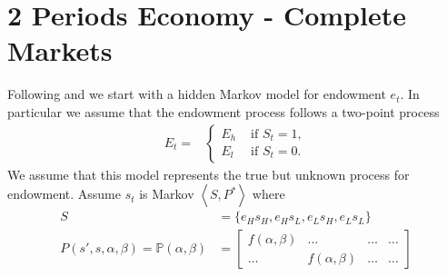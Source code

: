 \documentclass[a4paper,12pt]{article}
\begin{document}
\newpage
\section{2 Periods Economy - Complete Markets}
Following \cite{CS08} and \cite{CS09} we start with a hidden Markov model for endowment $e_t$. In particular we assume that the endowment process follows a two-point process
\begin{align*}
E_t = &
\begin{cases}
E_h &\text{ if $S_t = 1$}, \\
E_l &\text{ if $S_t = 0$}. 
\end{cases}
\end{align*}
We assume that this model represents the true but unknown process for endowment.
Assume $s_t$ is Markov $\left\langle  S, P^{*} \right\rangle$ where
\begin{align*}
                 S &= \lbrace e_H s_H, e_H s_L,  e_L s_H, e_L s_L \rbrace \\
P(s',s,\alpha, \beta) = \mathbb{P}(\alpha,\beta) &= \begin{bmatrix}
	f(\alpha,\beta)	        &\ldots  &\ldots  &\ldots \\
	\ldots                  &f(\alpha,\beta) &\ldots  &\ldots
\end{bmatrix} 
\end{align*}
\end{document}

